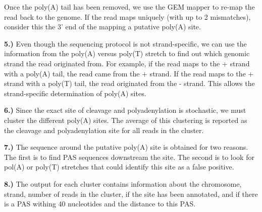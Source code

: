 Once the poly(A) tail has been removed, we use the GEM mapper to re-map the
read back to the genome. If the read maps uniquely (with up to 2 mismatches),
consider this the 3' end of the mapping a putative poly(A) site.

\textbf{5.)} Even though the sequencing protocol is not strand-specific, we can
use the information from the poly(A) versus poly(T) stretch to find out which
genomic strand the read originated from. For example, if the read maps to the
+ strand with a poly(A) tail, the read came from the + strand. If the
read maps to the + strand with a poly(T) tail, the read originated from the -
strand. This allows the strand-specific determination of poly(A) sites.

\textbf{6.)} Since the exact site of cleavage and polyadenylation is stochastic,
we must cluster the different poly(A) sites. The average of this clustering is
reported as the cleavage and polyadenylation site for all reads in the cluster.

\textbf{7.)} The sequence around the putative poly(A) site is obtained for two
reasons. The first is to find PAS sequences downstream the site. The second is
to look for pol(A) or poly(T) stretches that could identify this site as a
false positive.

\textbf{8.)} The output for each cluster contains information about the
chromosome, strand, number of reads in the cluster, if the site has been
annotated, and if there is a PAS withing 40 nucleotides and the distance to
this PAS.
